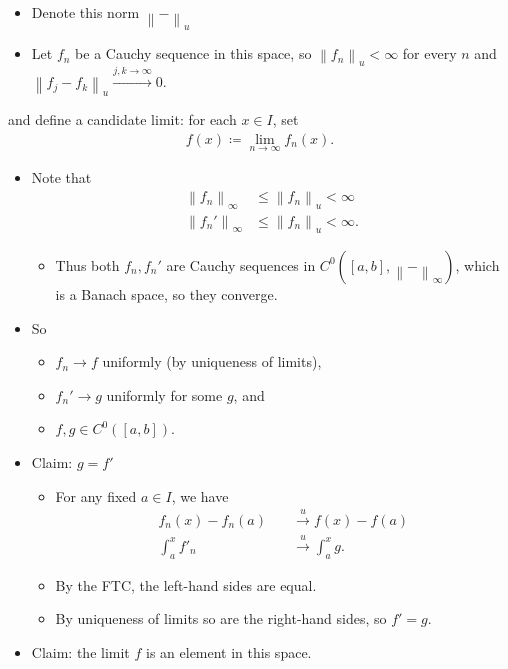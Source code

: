 \begin{solution}

\envlist

\begin{itemize}
\item
  Denote this norm \({\left\lVert {{-}} \right\rVert}_u\)
\item
  Let \(f_n\) be a Cauchy sequence in this space, so
  \({\left\lVert {f_n} \right\rVert}_u < \infty\) for every \(n\) and
  \({\left\lVert {f_j - f_k} \right\rVert}_u \overset{j, k\to\infty}\to 0\).
\end{itemize}

and define a candidate limit: for each \(x\in I\), set
\begin{align*}f(x) \coloneqq\lim_{n\to\infty} f_n(x).\end{align*}

\begin{itemize}
\item
  Note that
  \begin{align*} 
  {\left\lVert {f_n} \right\rVert}_\infty &\leq {\left\lVert {f_n} \right\rVert}_u < \infty \\
  {\left\lVert {f_n'} \right\rVert}_\infty &\leq {\left\lVert {f_n} \right\rVert}_u < \infty
  .\end{align*}

  \begin{itemize}
  \tightlist
  \item
    Thus both \(f_n, f_n'\) are Cauchy sequences in
    \(C^0([a, b], {\left\lVert {{-}} \right\rVert}_\infty)\), which is a
    Banach space, so they converge.
  \end{itemize}
\item
  So

  \begin{itemize}
  \tightlist
  \item
    \(f_n \to f\) uniformly (by uniqueness of limits),
  \item
    \(f_n' \to g\) uniformly for some \(g\), and
  \item
    \(f, g\in C^0([a, b])\).
  \end{itemize}
\item
  Claim: \(g = f'\)

  \begin{itemize}
  \tightlist
  \item
    For any fixed \(a\in I\), we have
    \begin{align*}
    f_n(x) - f_n(a) \quad &\overset{u}\to f(x) - f(a) \\
    \int_a^x f'_n  \quad &\overset{u}\to \int_a^x  g
    .\end{align*}
  \item
    By the FTC, the left-hand sides are equal.
  \item
    By uniqueness of limits so are the right-hand sides, so \(f' = g\).
  \end{itemize}
\item
  Claim: the limit \(f\) is an element in this space.


\end{itemize}
\end{solution}
